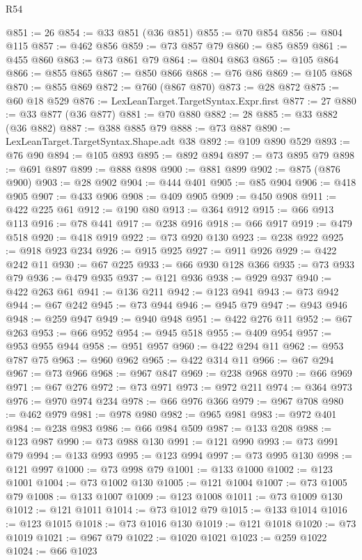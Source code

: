 \begin{lexlean}{R54}
\begin{coremodule}
@851 := 26
@854 := @33 @851 (@36 @851)
@855 := @70 @854
@856 := @804 @115
@857 := @462 @856
@859 := @73 @857 @79
@860 := @85 @859
@861 := @455 @860
@863 := @73 @861 @79
@864 := @804 @863
@865 := @105 @864
@866 := @855 @865
@867 := @850 @866
@868 := @76 @86
@869 := @105 @868
@870 := @855 @869
@872 := @760 (@867 @870)
@873 := @28 @872
@875 := @60 @18 @529
@876 := LexLeanTarget.TargetSyntax.Expr.first
@877 := 27
@880 := @33 @877 (@36 @877)
@881 := @70 @880
@882 := 28
@885 := @33 @882 (@36 @882)
@887 := @388 @885 @79
@888 := @73 @887
@890 := LexLeanTarget.TargetSyntax.Shape.adt @38
@892 := @109 @890 @529
@893 := @76 @90
@894 := @105 @893
@895 := @892 @894
@897 := @73 @895 @79
@898 := @691 @897
@899 := @888 @898
@900 := @881 @899
@902 := @875 (@876 @900)
@903 := @28 @902
@904 := @444 @401
@905 := @85 @904
@906 := @418 @905
@907 := @433 @906
@908 := @409 @905
@909 := @450 @908
@911 := @422 @225 @61
@912 := @190 @80
@913 := @364 @912
@915 := @66 @913 @113
@916 := @78 @441
@917 := @238 @916
@918 := @66 @917
@919 := @479 @518
@920 := @418 @919
@922 := @73 @920 @130
@923 := @238 @922
@925 := @918 @923 @234
@926 := @915 @925
@927 := @911 @926
@929 := @422 @242 @11
@930 := @67 @225
@933 := @66 @930 @128 @366
@935 := @73 @933 @79
@936 := @479 @935
@937 := @121 @936
@938 := @929 @937
@940 := @422 @263 @61
@941 := @136 @211
@942 := @123 @941
@943 := @73 @942
@944 := @67 @242
@945 := @73 @944
@946 := @945 @79
@947 := @943 @946
@948 := @259 @947
@949 := @940 @948
@951 := @422 @276 @11
@952 := @67 @263
@953 := @66 @952
@954 := @945 @518
@955 := @409 @954
@957 := @953 @955 @944
@958 := @951 @957
@960 := @422 @294 @11
@962 := @953 @787 @75
@963 := @960 @962
@965 := @422 @314 @11
@966 := @67 @294
@967 := @73 @966
@968 := @967 @847
@969 := @238 @968
@970 := @66 @969
@971 := @67 @276
@972 := @73 @971
@973 := @972 @211
@974 := @364 @973
@976 := @970 @974 @234
@978 := @66 @976 @366
@979 := @967 @708
@980 := @462 @979
@981 := @978 @980
@982 := @965 @981
@983 := @972 @401
@984 := @238 @983
@986 := @66 @984 @509
@987 := @133 @208
@988 := @123 @987
@990 := @73 @988 @130
@991 := @121 @990
@993 := @73 @991 @79
@994 := @133 @993
@995 := @123 @994
@997 := @73 @995 @130
@998 := @121 @997
@1000 := @73 @998 @79
@1001 := @133 @1000
@1002 := @123 @1001
@1004 := @73 @1002 @130
@1005 := @121 @1004
@1007 := @73 @1005 @79
@1008 := @133 @1007
@1009 := @123 @1008
@1011 := @73 @1009 @130
@1012 := @121 @1011
@1014 := @73 @1012 @79
@1015 := @133 @1014
@1016 := @123 @1015
@1018 := @73 @1016 @130
@1019 := @121 @1018
@1020 := @73 @1019
@1021 := @967 @79
@1022 := @1020 @1021
@1023 := @259 @1022
@1024 := @66 @1023

\end{coremodule}
\end{lexlean}
